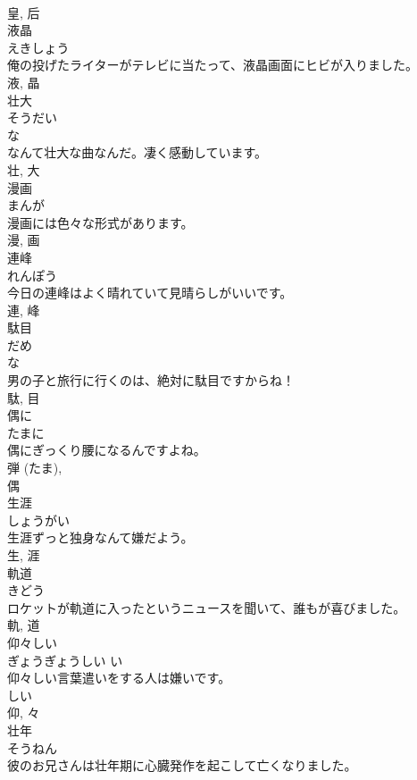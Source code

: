 \documentclass[8pt]{extreport}
\begin{document}
\begin{CJK}{UTF8}{min}
\\	皇, 后	
\\	液晶	
\\	えきしょう	
\\	俺の投げたライターがテレビに当たって、液晶画面にヒビが入りました。	
\\	液, 晶	
\\	壮大	
\\	そうだい	
\\	な 
\\	なんて壮大な曲なんだ。凄く感動しています。	
\\	壮, 大	
\\	漫画	
\\	まんが	
\\	漫画には色々な形式があります。	
\\	漫, 画	
\\	連峰	
\\	れんぽう	
\\	今日の連峰はよく晴れていて見晴らしがいいです。	
\\	連, 峰	
\\	駄目	
\\	だめ	
\\	な 
\\	男の子と旅行に行くのは、絶対に駄目ですからね！	
\\	駄, 目	
\\	偶に	
\\	たまに	
\\	偶にぎっくり腰になるんですよね。	
\\	弾 (たま), 
\\	偶	
\\	生涯	
\\	しょうがい	
\\	生涯ずっと独身なんて嫌だよう。	
\\	生, 涯	
\\	軌道	
\\	きどう	
\\	ロケットが軌道に入ったというニュースを聞いて、誰もが喜びました。	
\\	軌, 道	
\\	仰々しい	
\\	ぎょうぎょうしい	い 
\\	仰々しい言葉遣いをする人は嫌いです。	
\\	しい 
\\	仰, 々	
\\	壮年	
\\	そうねん	
\\	彼のお兄さんは壮年期に心臓発作を起こして亡くなりました。	

\end{CJK}
\end{document}

